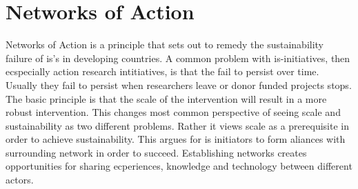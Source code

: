 \section{Networks of Action}
Networks of Action is a principle that sets out to remedy the sustainability failure of \gls{is}'s in developing countries. 
A common problem with \gls{is}-initiatives, then ecspecially action research intitiatives, is that the fail to persist over time.
Usually they fail to persist when researchers leave or donor funded projects stops. 
The basic principle is that the scale of the intervention will result in a more robust intervention. 
This changes most common perspective of seeing scale and sustainability as two different problems. 
Rather it views scale as a prerequisite in order to achieve sustainability.
This argues for \gls{is} initiators to form aliances with surrounding network in order to succeed. 
Establishing networks creates opportunities for sharing ecperiences, knowledge  and technology between different actors. 
